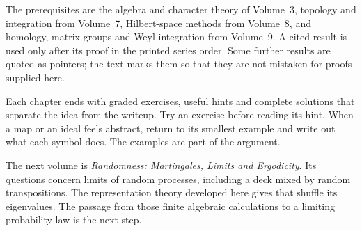 The prerequisites are the algebra and character theory of Volume~3, topology and integration from Volume~7, Hilbert-space methods from Volume~8, and homology, matrix groups and Weyl integration from Volume~9. A cited result is used only after its proof in the printed series order. Some further results are quoted as pointers; the text marks them so that they are not mistaken for proofs supplied here.

Each chapter ends with graded exercises, useful hints and complete solutions that separate the idea from the writeup. Try an exercise before reading its hint. When a map or an ideal feels abstract, return to its smallest example and write out what each symbol does. The examples are part of the argument.

The next volume is \emph{Randomness: Martingales, Limits and Ergodicity}. Its questions concern limits of random processes, including a deck mixed by random transpositions. The representation theory developed here gives that shuffle its eigenvalues. The passage from those finite algebraic calculations to a limiting probability law is the next step.
